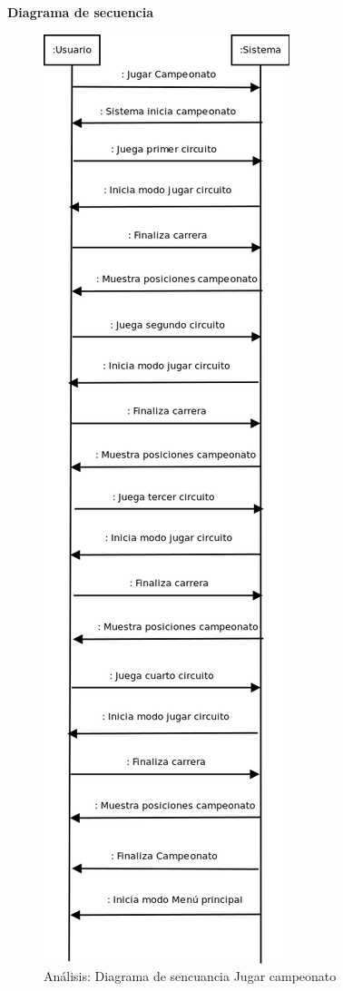 \textbf{Diagrama de secuencia}
\begin{figure}[H]
  \label{dia_jugar_campeonato}
  \begin{center}
    \includegraphics[scale=0.5]{imagenes/dia_jugar_campeonato.png}
  \end{center}
  \caption{Análisis: Diagrama de sencuancia Jugar campeonato}
\end{figure}

